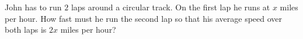 John has to run $2$ laps around a circular track. On the first lap he runs at $x$ miles per hour. How fast must he run the second lap so that his average speed over both laps is $2x$ miles per hour?

